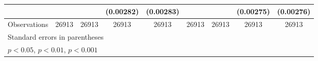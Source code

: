 \begin{table}[htbp]
\begin{tabular}{l*{8}{c}}
                         &                     &                     &   (0.00282)         &   (0.00283)         &                     &                     &   (0.00275)         &   (0.00276)         \\
\hline
Observations             &       26913         &       26913         &       26913         &       26913         &       26913         &       26913         &       26913         &       26913         \\
\hline\hline
\multicolumn{9}{l}{\footnotesize Standard errors in parentheses}\\
\multicolumn{9}{l}{\footnotesize \sym{*} \(p<0.05\), \sym{**} \(p<0.01\), \sym{***} \(p<0.001\)}\\
\end{tabular}
\end{table}

